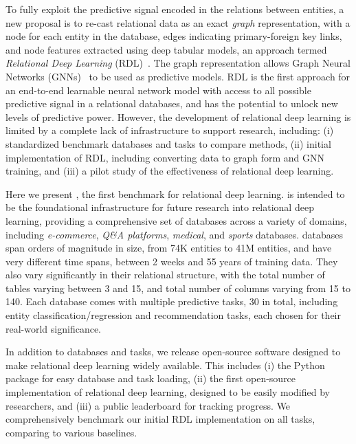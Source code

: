 To fully exploit the predictive signal encoded in the relations between entities, a new proposal is to re-cast relational data as an exact \emph{graph} representation, with a node for each entity in the database, edges indicating primary-foreign key links, and node features extracted using deep tabular models, an approach termed \emph{Relational Deep Learning} (RDL)~\citep{fey2023relational}. The graph representation allows Graph Neural Networks (GNNs)~\citep{gilmer2017mpgnn, hamilton2017inductive} to be used as predictive models. RDL is the first approach for an end-to-end learnable neural network model with access to all possible predictive signal in a relational databases, and has the potential to unlock new levels of predictive power.
However, the development of relational deep learning is limited by a complete lack of infrastructure to support research, including: (i) standardized benchmark databases and tasks to compare methods, (ii) initial implementation of RDL, including converting data to graph form and GNN training, and (iii) a pilot study of the effectiveness of relational deep learning. 

Here we present \relbench, the first benchmark for relational deep learning. \relbench is intended to be the foundational infrastructure for future research into relational deep learning, providing a comprehensive set of databases across a variety of domains, including \emph {e-commerce}, \emph{Q\&A platforms}, \emph{medical}, and \emph{sports} databases. \relbench databases span orders of magnitude in size, from 74K entities to 41M entities, and have very different time spans, between 2 weeks and 55 years of training data. They also vary significantly in their relational structure, with the total number of tables varying between 3 and 15, and total number of columns varying from 15 to 140.
Each database comes with multiple predictive tasks, 30 in total, including entity classification/regression and recommendation tasks, each chosen for their  real-world significance.

In addition to databases and tasks, we release open-source software designed to make relational deep learning widely available. This includes (i) the \relbench Python package for easy database and task loading, (ii) the first open-source implementation of relational deep learning, designed to be easily modified by researchers, and (iii) a public leaderboard for tracking progress. We comprehensively benchmark our initial RDL implementation on all \relbench tasks, comparing to various baselines. 

